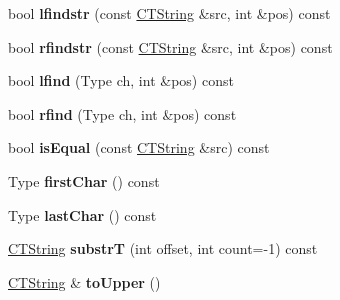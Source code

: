 \begin{DoxyCompactItemize}
\item 
\hypertarget{classps_1_1CTString_af220b772dc560b94a3554af52ed04748}{}bool {\bfseries lfindstr} (const \hyperlink{classps_1_1CTString}{C\+T\+String} \&src, int \&pos) const \label{classps_1_1CTString_af220b772dc560b94a3554af52ed04748}

\item 
\hypertarget{classps_1_1CTString_a634dbcf202a94a71d064dbf9a1bf7a3e}{}bool {\bfseries rfindstr} (const \hyperlink{classps_1_1CTString}{C\+T\+String} \&src, int \&pos) const \label{classps_1_1CTString_a634dbcf202a94a71d064dbf9a1bf7a3e}

\item 
\hypertarget{classps_1_1CTString_ac6fc1aced23554458b5974210089b7e6}{}bool {\bfseries lfind} (Type ch, int \&pos) const \label{classps_1_1CTString_ac6fc1aced23554458b5974210089b7e6}

\item 
\hypertarget{classps_1_1CTString_a4df2c943d88a2e22cd68929615e550c6}{}bool {\bfseries rfind} (Type ch, int \&pos) const \label{classps_1_1CTString_a4df2c943d88a2e22cd68929615e550c6}

\item 
\hypertarget{classps_1_1CTString_a8188fd1568010ea96db0358cd2358965}{}bool {\bfseries is\+Equal} (const \hyperlink{classps_1_1CTString}{C\+T\+String} \&src) const \label{classps_1_1CTString_a8188fd1568010ea96db0358cd2358965}

\item 
\hypertarget{classps_1_1CTString_ad076ea9e264ff3354fea0d2ca76fb1e9}{}Type {\bfseries first\+Char} () const \label{classps_1_1CTString_ad076ea9e264ff3354fea0d2ca76fb1e9}

\item 
\hypertarget{classps_1_1CTString_a7f5d3fe1de214c0fdd26d259a6a94244}{}Type {\bfseries last\+Char} () const \label{classps_1_1CTString_a7f5d3fe1de214c0fdd26d259a6a94244}

\item 
\hypertarget{classps_1_1CTString_a287d1aebb1a6899122fd0092bd5ef024}{}\hyperlink{classps_1_1CTString}{C\+T\+String} {\bfseries substr\+T} (int offset, int count=-\/1) const \label{classps_1_1CTString_a287d1aebb1a6899122fd0092bd5ef024}

\item 
\hypertarget{classps_1_1CTString_a0e222fca690ee651d9b6ab3f51e6efb4}{}\hyperlink{classps_1_1CTString}{C\+T\+String} \& {\bfseries to\+Upper} ()\label{classps_1_1CTString_a0e222fca690ee651d9b6ab3f51e6efb4}


\end{DoxyCompactItemize}
